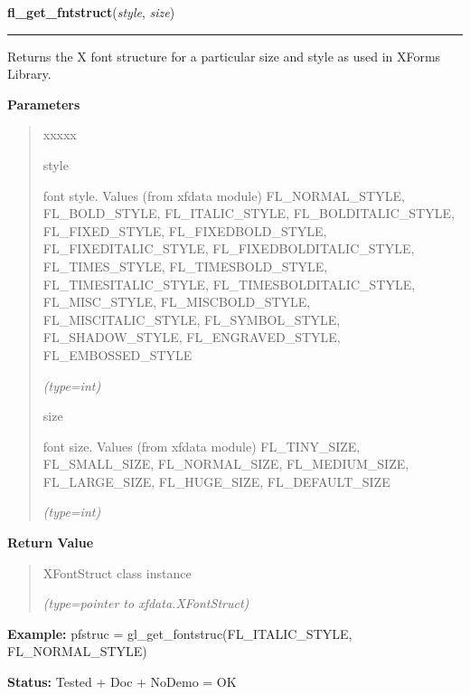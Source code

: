 \hspace{.8\funcindent}\begin{boxedminipage}{\funcwidth}

    \raggedright \textbf{fl\_get\_fntstruct}(\textit{style}, \textit{size})

    \vspace{-1.5ex}

    \rule{\textwidth}{0.5\fboxrule}
\setlength{\parskip}{2ex}
    Returns the X font structure for a particular size and style as used in
    XForms Library.

\setlength{\parskip}{1ex}
      \textbf{Parameters}
      \vspace{-1ex}

      \begin{quote}
        \begin{Ventry}{xxxxx}

          \item[style]

          font style. Values (from xfdata module) FL\_NORMAL\_STYLE, 
          FL\_BOLD\_STYLE, FL\_ITALIC\_STYLE, FL\_BOLDITALIC\_STYLE, 
          FL\_FIXED\_STYLE, FL\_FIXEDBOLD\_STYLE, FL\_FIXEDITALIC\_STYLE, 
          FL\_FIXEDBOLDITALIC\_STYLE, FL\_TIMES\_STYLE, 
          FL\_TIMESBOLD\_STYLE, FL\_TIMESITALIC\_STYLE, 
          FL\_TIMESBOLDITALIC\_STYLE, FL\_MISC\_STYLE, FL\_MISCBOLD\_STYLE,
          FL\_MISCITALIC\_STYLE, FL\_SYMBOL\_STYLE, FL\_SHADOW\_STYLE, 
          FL\_ENGRAVED\_STYLE, FL\_EMBOSSED\_STYLE

            {\it (type=int)}

          \item[size]

          font size. Values (from xfdata module) FL\_TINY\_SIZE, 
          FL\_SMALL\_SIZE, FL\_NORMAL\_SIZE, FL\_MEDIUM\_SIZE, 
          FL\_LARGE\_SIZE, FL\_HUGE\_SIZE, FL\_DEFAULT\_SIZE

            {\it (type=int)}

        \end{Ventry}

      \end{quote}

      \textbf{Return Value}
    \vspace{-1ex}

      \begin{quote}
      XFontStruct class instance

      {\it (type=pointer to xfdata.XFontStruct)}

      \end{quote}

\textbf{Example:} pfstruc = gl\_get\_fontstruc(FL\_ITALIC\_STYLE, FL\_NORMAL\_STYLE)



\textbf{Status:} Tested + Doc + NoDemo = OK



    \end{boxedminipage}


